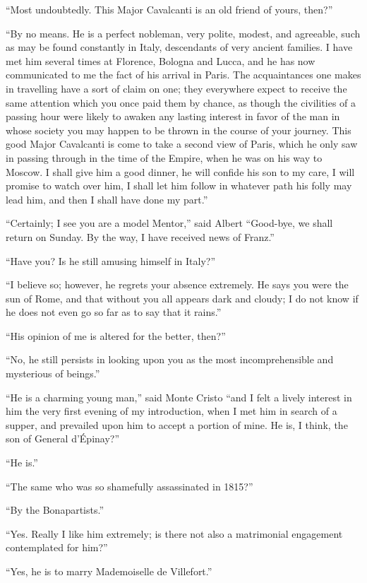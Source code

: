 “Most undoubtedly. This Major Cavalcanti is an old friend of yours,
then?”

“By no means. He is a perfect nobleman, very polite, modest, and
agreeable, such as may be found constantly in Italy, descendants of
very ancient families. I have met him several times at Florence,
Bologna and Lucca, and he has now communicated to me the fact of his
arrival in Paris. The acquaintances one makes in travelling have a sort
of claim on one; they everywhere expect to receive the same attention
which you once paid them by chance, as though the civilities of a
passing hour were likely to awaken any lasting interest in favor of the
man in whose society you may happen to be thrown in the course of your
journey. This good Major Cavalcanti is come to take a second view of
Paris, which he only saw in passing through in the time of the Empire,
when he was on his way to Moscow. I shall give him a good dinner, he
will confide his son to my care, I will promise to watch over him, I
shall let him follow in whatever path his folly may lead him, and then
I shall have done my part.”

“Certainly; I see you are a model Mentor,” said Albert “Good-bye, we
shall return on Sunday. By the way, I have received news of Franz.”

“Have you? Is he still amusing himself in Italy?”

“I believe so; however, he regrets your absence extremely. He says you
were the sun of Rome, and that without you all appears dark and cloudy;
I do not know if he does not even go so far as to say that it rains.”

“His opinion of me is altered for the better, then?”

“No, he still persists in looking upon you as the most incomprehensible
and mysterious of beings.”

“He is a charming young man,” said Monte Cristo “and I felt a lively
interest in him the very first evening of my introduction, when I met
him in search of a supper, and prevailed upon him to accept a portion
of mine. He is, I think, the son of General d’Épinay?”

“He is.”

“The same who was so shamefully assassinated in 1815?”

“By the Bonapartists.”

“Yes. Really I like him extremely; is there not also a matrimonial
engagement contemplated for him?”

“Yes, he is to marry Mademoiselle de Villefort.”


